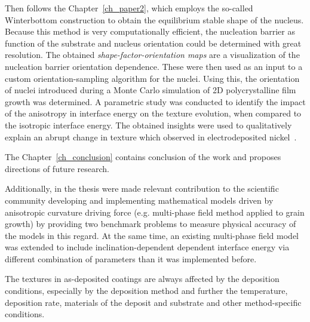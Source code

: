 Then follows the Chapter~\ref{ch_paper2}, which employs the so-called Winterbottom construction to obtain the equilibrium stable shape of the nucleus. Because this method is very computationally efficient, the nucleation barrier as function of the substrate and nucleus orientation could be determined with great resolution. The obtained \textit{shape-factor-orientation maps} are a visualization of the nucleation barrier orientation dependence. These were then used as an input to a custom orientation-sampling algorithm for the nuclei. Using this, the orientation of nuclei introduced during a Monte Carlo simulation of 2D polycrystalline film growth was determined. A parametric study was conducted to identify the impact of the anisotropy in interface energy on the texture evolution, when compared to the isotropic interface energy. The obtained insights were used to qualitatively explain an abrupt change in texture which observed in electrodeposited nickel~\cite{Alimadadi2016}.

The Chapter~\ref{ch_conclusion} contains conclusion of the work and proposes directions of future research.




Additionally, in the thesis were made relevant contribution to the scientific community developing and implementing mathematical models driven by anisotropic curvature driving force (e.g. multi-phase field method applied to grain growth) by providing two benchmark problems to measure physical accuracy of the models in this regard. At the same time, an existing multi-phase field model was extended to include inclination-dependent dependent interface energy via different combination of parameters than it was implemented before.

The textures in as-deposited coatings are always affected by the deposition conditions, especially by the deposition method and further the temperature, deposition rate, materials of the deposit and substrate and other method-specific conditions. 

%
%
%



